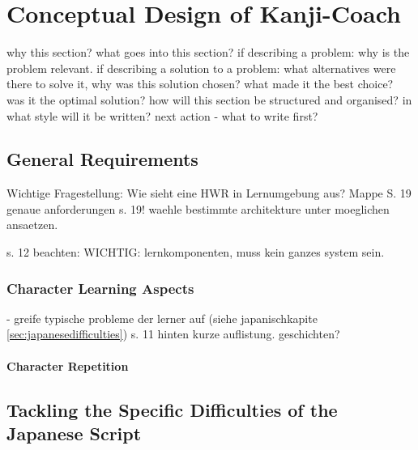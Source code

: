 
\chapter{Conceptual Design of Kanji-Coach}
\label{chap:conceptualdesignofkanjicoach}

why this section? 
what goes into this section?
  if describing a problem: why is the problem relevant.
  if describing a solution to a problem: what alternatives were
  there to solve it, why was this solution chosen? what made it the best
  choice? was it the optimal solution?
how will this section be structured and organised?
in what style will it be written?
next action - what to write first?


\section{General Requirements}
\label{sec:concept:generalrequirements}

Wichtige Fragestellung: Wie sieht eine HWR in Lernumgebung aus?
Mappe S. 19
genaue anforderungen s. 19!
waehle bestimmte architekture unter moeglichen ansaetzen.

s. 12 beachten: WICHTIG: lernkomponenten, muss kein ganzes system sein.



\subsection{Character Learning Aspects}
\label{sec:concept:charaterlearningaspects}


- greife typische probleme der lerner auf 
  (siehe japanischkapite \ref{sec:japanesedifficulties})
  s. 11 hinten kurze auflistung. geschichten?

\subsubsection{Character Repetition}
\label{sec:concept:characterrepetition} %


\section{Tackling the Specific Difficulties of the Japanese Script}
\label{sec:concept:tacklingdifficulties}

